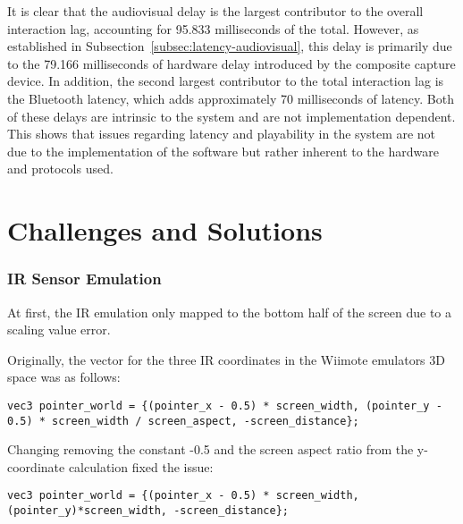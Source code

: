 It is clear that the audiovisual delay is the largest contributor to the overall
interaction lag, accounting for 95.833 milliseconds of the total. However, as
established in Subsection~\ref{subsec:latency-audiovisual}, this delay is
primarily due to the 79.166 milliseconds of hardware delay introduced by the
composite capture device. In addition, the second largest contributor to the
total interaction lag is the Bluetooth latency, which adds
approximately 70 milliseconds of latency. Both of these delays are intrinsic to the system
and are not implementation dependent. This shows that issues regarding
latency and playability in the system are not due to the implementation of the software but
rather inherent to the hardware and protocols used.

\section{Challenges and Solutions}


\subsubsection{IR Sensor Emulation}
At first, the IR emulation only mapped to the bottom half of the screen due to a scaling value error.

Originally, the vector for the three IR coordinates in the Wiimote emulators 3D space was as follows:
\begin{lstlisting}[style=CStyle, emph={vec3}, emphstyle={\color{magenta}}]
vec3 pointer_world = {(pointer_x - 0.5) * screen_width, (pointer_y - 0.5) * screen_width / screen_aspect, -screen_distance};
\end{lstlisting}

Changing removing the constant -0.5 and the screen aspect ratio from the y-coordinate calculation fixed the issue:
\begin{lstlisting}[style=CStyle, emph={vec3}, emphstyle={\color{magenta}}]
vec3 pointer_world = {(pointer_x - 0.5) * screen_width, (pointer_y)*screen_width, -screen_distance};
\end{lstlisting}

